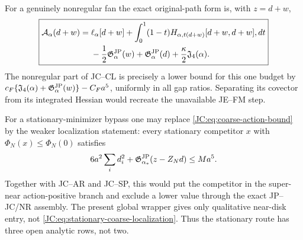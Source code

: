 \begin{contract}
For a genuinely nonregular fan the exact original-path form is, with
$z=d+w$,
\begin{equation}\label{JC:eq:nonregular-original-path-action}
 \boxed{
 \begin{aligned}
 \mathcal{A}_\alpha(d+w)={}&\ell_\alpha[d+w]
 +\int_0^1(1-t)
 H_{\alpha,t(d+w)}[d+w,d+w],dt\\
 &-\frac12\mathfrak G^{\rm JP}_\alpha(w)+\mathfrak G^{\rm JP}_\alpha(d)
 +\frac\kappa2\mathfrak J_4(\alpha).
 \end{aligned}}
\end{equation}
The nonregular part of JC--CL is precisely a lower bound for this one
budget by $c_F\{\mathfrak J_4(\alpha)+\mathfrak G^{\rm JP}_\alpha(w)\}-C_Fa^5$, uniformly in
all gap ratios.  Separating its covector from its integrated Hessian would
recreate the unavailable JE--FM step.

For a stationary-minimizer bypass one may replace
\eqref{JC:eq:coarse-action-bound} by the weaker localization statement:
every stationary competitor $x$ with
$\Phi_N(x)\le\Phi_N(0)$ satisfies
\begin{equation}\label{JC:eq:stationary-coarse-localization}
 6a^2\sum_i d_i^2
 +\mathfrak G^{\rm JP}_{\alpha_*}(z-Z_Nd)\le Ma^5.
\end{equation}
Together with JC--AR and JC--SP, this would put the competitor in the
super-near action-positive branch and exclude a lower value through the
exact JP--JC/NR assembly.  The present global wrapper
gives only qualitative near-disk entry, not
\eqref{JC:eq:stationary-coarse-localization}.  Thus the stationary route has
three open analytic rows, not two.
\end{contract}


